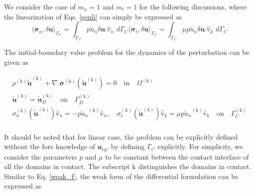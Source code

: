 We consider the case of $m_n = 1$ and $m_t = 1$ for the following discussions, where the linearization of Eqs. \eqref{genli} can simply be expressed as\\ 
 
 \begin{subequations}
 \begin{equation}
 {\langle \bm{\sigma}_n, \delta \bm u \rangle_{\Gamma_C}}= \int_{\Gamma_C} \mathit{p}{\widetilde{u}_n}\delta \bm{u}.\bm{\hat{\mathrm v}}_n \,\, d\Gamma_C
   \end{equation}
   \begin{equation}
  {\langle \bm{\sigma}_t, \delta \bm u \rangle_{\Gamma_C}}= \int_{\Gamma_C} \mu \mathit{p}{\widetilde{u}_n}\delta \bm{u}.\bm{\hat{\mathrm v}}_k \,\, d\Gamma_C
     \end{equation}
   \end{subequations}
   
 The initial-boundary value problem for the dynamics of the perturbation can be given as
 
\begin{equation}\label{pert_dyn}
\begin{split}
\rho^\mathrm{(k)}\bm{\ddot{\widetilde{u}}}^\mathrm{(k)} +\nabla\bm{.}\bm{\sigma}^\mathrm{(k)}(\bm{\widetilde u}^\mathrm{(k)}) = 0 \quad \mathrm{in} \quad \Omega^\mathrm{(k)}\\ 
\bm{\widetilde u}^\mathrm{(k)} = \bm{\widetilde u}^\mathrm{(k)}_{D} \quad \mathrm{on}\quad\Gamma^{\mathrm{(k)}}_D\\
\sigma^{(\mathrm k)}_n(\bm{\widetilde u}^\mathrm{(k)}) \bm{\hat{\mathrm v}}_n = - \mathit{p}{\widetilde{u}_n}^{(\mathrm k)} \bm{\hat{\mathrm v}}_n,\quad \sigma^{(\mathrm k)}_t(\bm{\widetilde u}^\mathrm{(k)})  \bm{\hat{\mathrm v}}_k = \mu \mathit{p}{\widetilde{u}_n}^{(\mathrm k)} \bm{\hat{\mathrm v}}_k \quad \mathrm{on}\quad\Gamma^{\mathrm{(k)}}_C\\
\end{split}
\end{equation}

It should be noted that for linear case, the problem can be explicitly defined without the fore knowledge of $\bm u_{eq}$, by defining $\Gamma_C$ explicitly. For simplicity, we consider the parameters $p$ and $\mu$ to be constant between the contact interface of all the domains in contact. The subscript $\mathrm{k}$ distinguishes the domains in contact.  Similar to Eq. \eqref{weak_f}, the weak form of the differential formulation can be expressed as

